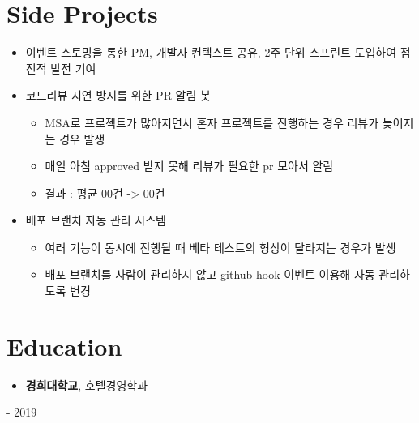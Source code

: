 \documentclass[10pt, letterpaper]{article}
\newenvironment{highlights}{
    \begin{itemize}[
        topsep=0.10 cm,
        parsep=0.10 cm,
        partopsep=0pt,
        itemsep=0pt,
        leftmargin=0.4 cm + 10pt
    ]
    }{
    \end{itemize}
} %
\newenvironment{twocolentry}[2][]{
    \onecolentry
    \def\secondColumn{#2}
    \setcolumnwidth{\fill, 4.5 cm}
    \begin{paracol}{2}
    }{
        \switchcolumn \raggedleft \secondColumn
    \end{paracol}
    \endonecolentry
} %
\begin{document}
    \vspace{0.2 cm}


    \section{Side Projects}


    \begin{highlights}

        \item 이벤트 스토밍을 통한 PM, 개발자 컨텍스트 공유, 2주 단위 스프린트 도입하여 점진적 발전 기여
        \item 코드리뷰 지연 방지를 위한 PR 알림 봇
        \begin{highlights}
            \item MSA로 프로젝트가 많아지면서 혼자 프로젝트를 진행하는 경우 리뷰가 늦어지는 경우 발생
            \item 매일 아침 approved 받지 못해 리뷰가 필요한 pr 모아서 알림
            \item 결과 : 평균 00건 -> 00건
        \end{highlights}
        \item 배포 브랜치 자동 관리 시스템
        \begin{highlights}
            \item 여러 기능이 동시에 진행될 때 베타 테스트의 형상이 달라지는 경우가 발생
            \item 배포 브랜치를 사람이 관리하지 않고 github hook 이벤트 이용해 자동 관리하도록 변경
        \end{highlights}

    \end{highlights}



    \section{Education}




    \begin{twocolentry}{
        2012 - 2019
    }
        \begin{highlights}

            \item \textbf{경희대학교}, 호텔경영학과

        \end{highlights}
    \end{twocolentry}

    \vspace{0.2 cm}
\end{document}
